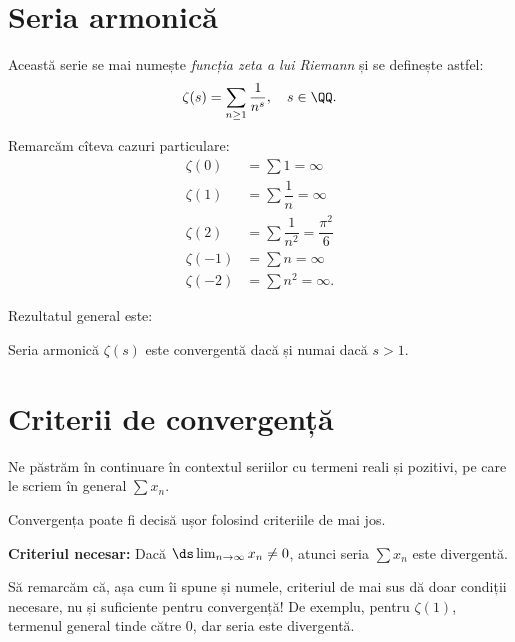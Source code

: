 \section{Seria armonică}

Această serie se mai numește \emph{funcția zeta a lui Riemann} și se
definește astfel:
\[
    \zeta(s) = \sum_{n \geq 1} \dfrac{1}{n^s}, \quad s \in \QQ.
\]

Remarcăm cîteva cazuri particulare:
\begin{align*}
    \zeta(0) &= \sum 1 = \infty \\
    \zeta(1) &= \sum \dfrac{1}{n} = \infty \\
    \zeta(2) &= \sum \dfrac{1}{n^2} = \dfrac{\pi^2}{6} \\
    \zeta(-1) &= \sum n = \infty \\
    \zeta(-2) &= \sum n^2 = \infty.
\end{align*}

Rezultatul general este:
\begin{theorem}\label{thm:zeta-conv}
    Seria armonică $ \zeta(s) $ este convergentă dacă și numai dacă
    $ s > 1 $.
\end{theorem}

\section{Criterii de convergență}

Ne păstrăm în continuare în contextul seriilor cu termeni reali și pozitivi,
pe care le scriem în general $ \sum x_n $.

Convergența poate fi decisă ușor folosind criteriile de mai jos.

\vspace{1cm}

\textbf{Criteriul necesar:} Dacă $ \ds\lim_{n \to \infty} x_n \neq 0 $, atunci
seria $ \sum x_n $ este divergentă.

\begin{remark}\label{rk:nec}
    Să remarcăm că, așa cum îi spune și numele, criteriul de mai sus dă doar
    condiții necesare, nu și suficiente pentru convergență! De exemplu, pentru
    $ \zeta(1) $, termenul general tinde către 0, dar seria este divergentă.
\end{remark}

\vspace{1cm}

